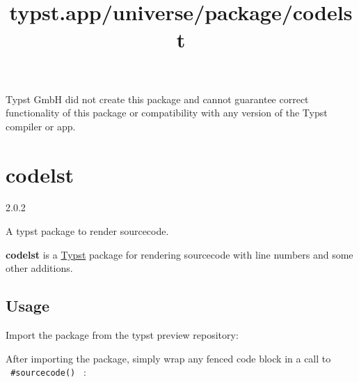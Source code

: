 Typst GmbH did not create this package and cannot guarantee correct
functionality of this package or compatibility with any version of the
Typst compiler or app.


\title{typst.app/universe/package/codelst}

\label{banner}
\section{codelst}\label{codelst}

{ 2.0.2 }

A typst package to render sourcecode.

\label{readme}
\textbf{codelst} is a \href{https://github.com/typst/typst}{Typst}
package for rendering sourcecode with line numbers and some other
additions.

\subsection{Usage}\label{usage}

Import the package from the typst preview repository:

\begin{Shaded}
\begin{Highlighting}[]
\OperatorTok{:}
\end{Highlighting}
\end{Shaded}

After importing the package, simply wrap any fenced code block in a call
to \texttt{\ \#sourcecode()\ } :

\begin{Shaded}
\begin{Highlighting}[]
\OperatorTok{:}

\NormalTok{\#sourcecode[}
\VerbatimStringTok{\#show "ArtosFlow": name =\textgreater{} box[}
\VerbatimStringTok{  ))}
\VerbatimStringTok{]}

\VerbatimStringTok{\textasciigrave{}\textasciigrave{}\textasciigrave{}}\NormalTok{]}
\end{Highlighting}
\end{Shaded}

